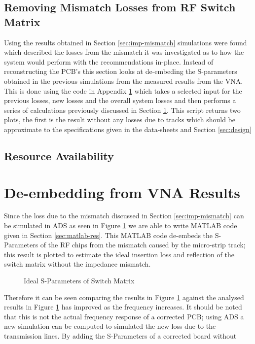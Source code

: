 \documentclass[12pt,openany,a4paper]{book}
\begin{document}
\subsection{Removing Mismatch Losses from RF Switch Matrix}
Using the results obtained in Section \ref{sec:imp-mismatch} simulations were found which described the losses from the mismatch it was investigated as to how the system would perform with the recommendations in-place. Instead of reconstructing the PCB's this section looks at de-embeding the S-parameters obtained in the previous simulations from the measured results from the VNA. This is done using the code in Appendix \ref{} which takes a selected input for the previous losses, new losses and the overall system losses and then performs a series of calculations previously discussed in Section \ref{}. %
This script returns two plots, the first is the result without any losses due to tracks which should be approximate to the specifications given in the data-sheets and Section \ref{sec:design}



\subsection{Resource Availability}



\section{De-embedding from VNA Results}
Since the loss due to the mismatch discussed in Section \ref{sec:imp-mismatch} can be simulated in ADS as seen in Figure \ref{} we are able to write MATLAB code given in Section \ref{sec:matlab-res}. This MATLAB code de-embeds the S-Parameters of the RF chips from the mismatch caused by the micro-strip track; this result is plotted to estimate the ideal insertion loss and reflection of the switch matrix without the impedance mismatch. 
\begin{figure}[H]
	\centering
	\caption{Ideal S-Parameters of Switch Matrix}
	\label{fig:ideal-switchmatrix}
\end{figure} 
Therefore it can be seen comparing the results in Figure \ref{fig:ideal-switchmatrix} against the analysed results in Figure \ref{} has improved as the frequency increases. It should be noted that this is not the actual frequency response of a corrected PCB; using ADS a new simulation can be computed to simulated the new loss due to the transmission lines. By adding the S-Parameters 
 of a corrected board without 
 
\end{document}
